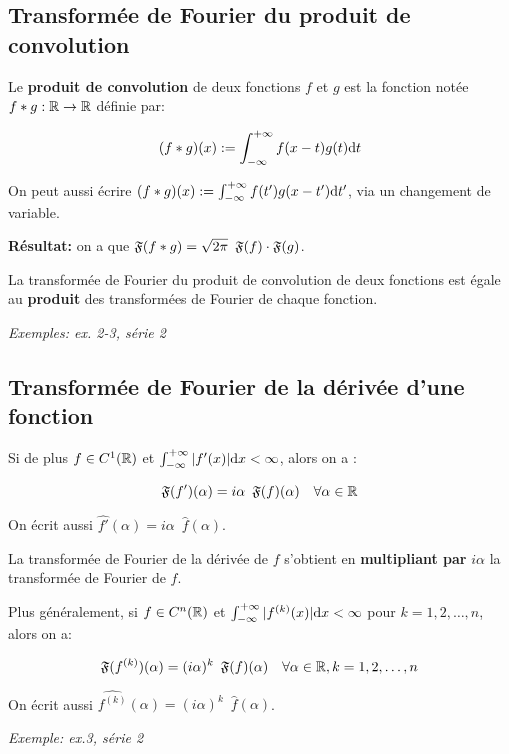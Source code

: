\subsection{Transformée de Fourier du produit de convolution}

\begin{definition}
    Le \textbf{produit de convolution} de deux fonctions $f$ et $g$ est la fonction notée $f \ast g: \mathbb{R} \rightarrow \mathbb{R}$ définie par:
    
    \[(f \ast g)(x) := \int_{-\infty}^{+\infty} f(x - t) g(t) \mathrm{d}t\]
\end{definition}

\begin{remark}
    On peut aussi écrire $(f \ast g)(x) := \int_{-\infty}^{+\infty} f(t') g(x - t') \mathrm{d}t'$, via un changement de variable.
\end{remark}

\textbf{Résultat:} on a que $\mathfrak{F}(f \ast g) = \sqrt{2\pi} \enspace \mathfrak{F}(f) \cdot \mathfrak{F}(g)$.

La transformée de Fourier du produit de convolution de deux fonctions est égale au \textbf{produit} des transformées de Fourier de chaque fonction.

\textit{Exemples: ex. 2-3, série 2}


\subsection{Transformée de Fourier de la dérivée d'une fonction}

Si de plus $f \in C^1(\mathbb{R})$ et $\int_{-\infty}^{+\infty} |f'(x)| \mathrm{d}x < \infty$, alors on a :

\[\mathfrak{F}(f')(\alpha) = i\alpha \enspace \mathfrak{F}(f)(\alpha) \quad \forall \alpha \in \mathbb{R}\]

On écrit aussi $\widehat{f'}(\alpha) = i\alpha \enspace \hat{f}(\alpha)$.

La transformée de Fourier de la dérivée de $f$ s'obtient en \textbf{multipliant par} $i\alpha$ la transformée de Fourier de $f$.

Plus généralement, si $f\in C^n(\mathbb{R})$ et $\int_{-\infty}^{+\infty} |f^{(k)}(x)| \mathrm{d}x < \infty$ pour $k=1,2,\ldots,n$, alors on a:

\[\mathfrak{F}(f^{(k)})(\alpha) = (i\alpha)^k \enspace \mathfrak{F}(f)(\alpha) \quad \forall \alpha \in \mathbb{R}, k = 1,2,\ldots,n\]

On écrit aussi $\widehat{f^{(k)}}(\alpha) = (i\alpha)^k \enspace \hat{f}(\alpha)$.

\textit{Exemple: ex.3, série 2}


